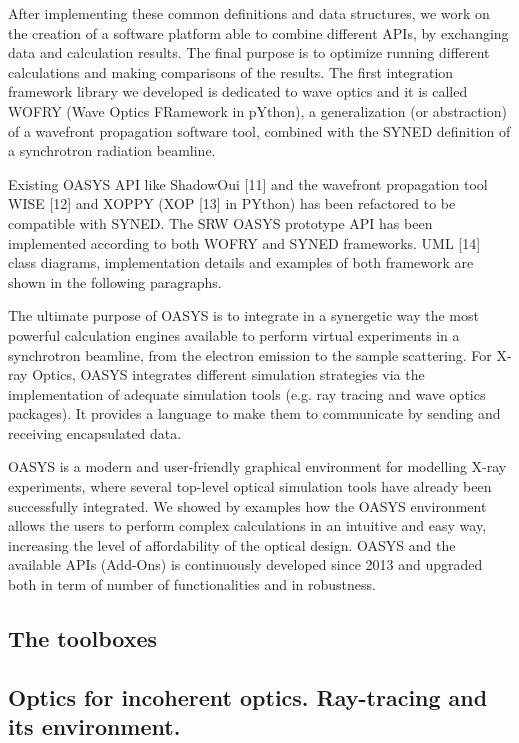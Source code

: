 \documentclass{aip-cp}
\begin{document}
After implementing these common definitions and data structures, we work on the creation of a software platform able to combine different APIs, by exchanging data and calculation results. The final purpose is to optimize running different calculations and making comparisons of the results. The first integration framework library we developed is dedicated to wave optics and it is called WOFRY (Wave Optics FRamework in pYthon), a generalization (or abstraction) of a wavefront propagation software tool, combined with the SYNED definition of a synchrotron radiation beamline.








Existing OASYS API like ShadowOui [11] and the wavefront propagation tool WISE [12] and XOPPY (XOP [13] in PYthon) has been refactored to be compatible with SYNED. The SRW OASYS prototype API has been implemented according to both WOFRY and SYNED frameworks. UML [14] class diagrams, implementation details and examples of both framework are shown in the following paragraphs.

The ultimate purpose of OASYS is to integrate in a synergetic way the most powerful calculation engines available to perform virtual experiments in a synchrotron beamline, from the electron emission to the sample scattering. For X-ray Optics, OASYS integrates different simulation strategies via the implementation of adequate simulation tools (e.g. ray tracing and wave optics packages). It provides a language to make them to communicate by sending and receiving encapsulated data.

OASYS is a modern and user-friendly graphical environment for modelling X-ray experiments, where several top-level optical simulation tools have already been successfully integrated. We showed by examples how the OASYS environment allows the users to perform complex calculations in an intuitive and easy way, increasing the level of affordability of the optical design. OASYS and the available APIs (Add-Ons) is continuously developed since 2013 and upgraded both in term of number of functionalities and in robustness.

\subsection{The toolboxes}

\subsection{Optics for incoherent optics. Ray-tracing and its environment.}
\end{document}
